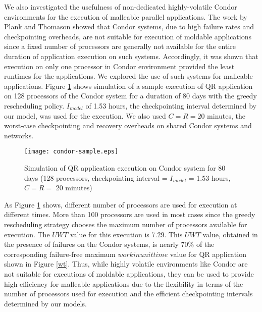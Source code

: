 \documentclass[conference,10pt]{IEEEtran}
\begin{document}
We also investigated the usefulness of non-dedicated highly-volatile
Condor environments for the execution of malleable parallel
applications. The work by Plank and
Thomason\cite{plank-processorallocation-jpdc01} showed that Condor
systems, due to high failure rates and checkpointing overheads, are
not suitable for execution of moldable applications since a fixed
number of processors are generally not available for the entire
duration of application execution on such systems. Accordingly, it was
shown that execution on only one processor in Condor environment
provided the least runtimes for the applications. We explored the use
of such systems for malleable applications. Figure \ref{condor-sample}
shows simulation of a sample execution of QR application on 128
processors of the Condor system for a duration of 80 days with the
greedy rescheduling policy. $I_{model}$ of 1.53 hours, the
checkpointing interval determined by our model, was used for the
execution. We also used $C=R=20$ minutes, the worst-case checkpointing
and recovery overheads on shared Condor systems and networks.

\begin{figure}
\centering
\texttt{[image: condor-sample.eps]}
\caption{Simulation of QR application execution on Condor system for
  80 days (128 processors, checkpointing interval = $I_{model}$ = 1.53 hours,
  $C=R=$ 20 minutes)}
\label{condor-sample}
\end{figure}

As Figure \ref{condor-sample} shows, different number of processors
are used for execution at different times. More than 100 processors
are used in most cases since the greedy rescheduling strategy chooses
the maximum number of processors available for execution. The $UWT$
value for this execution is 7.29. This $UWT$ value, obtained in the
presence of failures on the Condor systems, is nearly 70\% of the
corresponding failure-free maximum $workinunittime$ value for QR
application shown in Figure \ref{wt}. Thus, while highly volatile
environments like Condor are not suitable for executions of moldable
applications,  they can be used to provide high efficiency for
malleable applications due to the flexibility in terms of the number
of processors used for execution and the efficient checkpointing intervals
determined by our models.
\end{document}
